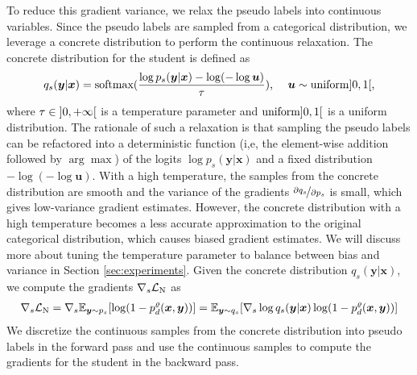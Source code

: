\documentclass{article}
\newcommand{\OVEC}[1]{\bm{#1}} %
\newcommand{\LOSS}[2]{\mathcal{#1}_{\rm{#2}}} %
\newcommand{\EXP}{\mathbb{E}} %
\newcommand{\negloss}{\LOSS{L}{N}}
\newcommand{\stdgrad}{\nabla_{s}}
\newcommand{\stddisgrad}{\stdgrad\negloss}
\newcommand{\abbrpstd}{p_{s}}
\newcommand{\abbrqstd}{q_{s}}
\newcommand{\fullpstd}[1]{p_{s}(#1|\OVEC{x})}
\newcommand{\fullqstd}[1]{q_{s}(#1|\OVEC{x})}
\newcommand{\fullpdis}[1]{p_{d}^{\varrho}(\OVEC{x},#1)}
\begin{document}
To reduce this gradient variance, we relax the pseudo labels into continuous variables.
Since the pseudo labels are sampled from a categorical distribution, we leverage a concrete distribution \cite{jang2016categorical,maddison2016concrete} to perform the continuous relaxation.
The concrete distribution for the student is defined as
\begin{equation} \label{equ:student concrete distribution}
\begin{aligned}
\fullqstd{\OVEC{y}}
=
\text{softmax}(\frac{\log\fullpstd{\OVEC{y}}-\log(-\log\OVEC{u})}{\tau})
\text{, } \quad
\OVEC{u}\sim\text{uniform}\interval[open left, open right]{0}{1}
\text{,}
\end{aligned}
\end{equation}%
where $\tau\in\interval[open left, open right]{0}{+\infty}$ is a temperature parameter and $\text{uniform}\interval[open left, open right]{0}{1}$ is a uniform distribution.
The rationale of such a relaxation is that sampling the pseudo labels can be refactored into a deterministic function (i,e, the element-wise addition followed by $\arg\max$) of the logits $\log\fullpstd{\OVEC{y}}$ and a fixed distribution $-\log(-\log\OVEC{u})$.
With a high temperature, the samples from the concrete distribution are smooth and the variance of the gradients $\nicefrac{\partial\abbrqstd}{\partial\abbrpstd}$ is small, which gives low-variance gradient estimates.
However, the concrete distribution with a high temperature becomes a less accurate approximation to the original categorical distribution, which causes biased gradient estimates.
We will discuss more about tuning the temperature parameter to balance between bias and variance in Section \ref{sec:experiments}.
Given the concrete distribution $\fullqstd{\OVEC{y}}$, we compute the gradients $\stddisgrad$ as
\begin{equation}
\begin{aligned}
\stddisgrad
=
\stdgrad\EXP_{\OVEC{y}\sim\abbrpstd}[\log(1-\fullpdis{\OVEC{y}})]
=
\EXP_{\OVEC{y}\sim\abbrqstd}
[\nabla_{s}\log\fullqstd{\OVEC{y}}\log(1-\fullpdis{\OVEC{y}})]
\end{aligned}
\end{equation}%
We discretize the continuous samples from the concrete distribution into pseudo labels in the forward pass and use the continuous samples to compute the gradients for the student in the backward pass.
\end{document}
